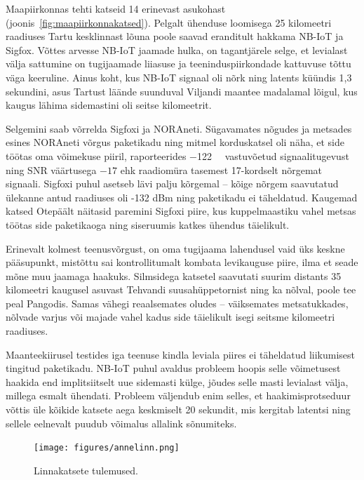\documentclass[12pt]{article}
\begin{document}
    Maapiirkonnas tehti katseid 14 erinevast asukohast (joonis~\ref{fig:maapiirkonnakatsed}). Pelgalt ühenduse loomisega 25 kilomeetri raadiuses Tartu kesklinnast lõuna poole saavad eranditult hakkama NB-IoT ja Sigfox.
    Võttes arvesse NB-IoT jaamade hulka, on tagantjärele selge, et levialast välja sattumine on tugijaamade liiasuse ja teeninduspiirkondade kattuvuse tõttu väga keeruline.
    Ainus koht, kus NB-IoT signaal oli nõrk ning latents küündis 1,3 sekundini, asus Tartust läände suunduval Viljandi maantee madalamal lõigul, kus kaugus lähima sidemastini oli seitse kilomeetrit.

    Selgemini saab võrrelda Sigfoxi ja NORAneti.
    Sügavamates nõgudes ja metsades esines NORAneti võrgus paketikadu ning mitmel korduskatsel oli näha, et side töötas oma võimekuse piiril, raporteerides \SI{-122}{\deci\belm} vastuvõetud signaalitugevust ning SNR väärtusega $-17$ ehk raadiomüra tasemest 17-kordselt nõrgemat signaali.
    Sigfoxi puhul asetseb lävi palju kõrgemal -- kõige nõrgem saavutatud ülekanne antud raadiuses oli -132 dBm ning paketikadu ei täheldatud.
    Kaugemad katsed Otepäält näitasid paremini Sigfoxi piire, kus kuppelmaastiku vahel metsas töötas side paketikaoga ning siseruumis katkes ühendus täielikult.

    Erinevalt kolmest teenusvõrgust, on oma tugijaama lahendusel vaid üks keskne pääsupunkt, mistõttu sai kontrollitumalt kombata levikauguse piire, ilma et seade mõne muu jaamaga haakuks.
    Silmsidega katsetel saavutati suurim distants 35 kilomeetri kaugusel asuvast Tehvandi suusahüppetornist ning ka nõlval, poole tee peal Pangodis.
    Samas vähegi reaalsemates oludes -- väiksemates metsatukkades, nõlvade varjus või majade vahel kadus side täielikult isegi seitsme kilomeetri raadiuses.

    Maanteekiirusel testides iga teenuse kindla leviala piires ei täheldatud liikumisest tingitud paketikadu.
    NB-IoT puhul avaldus probleem hoopis selle võimetusest haakida end implitsiitselt uue sidemasti külge, jõudes selle masti levialast välja, millega esmalt ühendati.
    Probleem väljendub enim selles, et haakimisprotseduur võttis üle kõikide katsete aega keskmiselt 20 sekundit, mis kergitab latentsi ning sellele eelnevalt puudub võimalus allalink sõnumiteks.

    \begin{figure} [p]
        \begin{center}
            \vspace*{-0.5cm}
            \texttt{[image: figures/annelinn.png]}
            \caption{Linnakatsete tulemused.}
            \label{fig:annelinn}
        \end{center}
    \end{figure}
\end{document}
